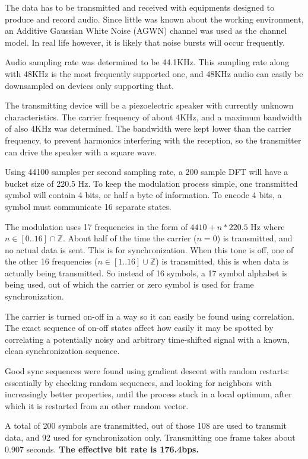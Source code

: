 \documentclass[a4paper]{article}
\begin{document}
The data has to be transmitted and received with equipments designed to
produce and record audio. Since little was known about the working
environment, an Additive Gaussian White Noise (AGWN) channel was used
as the channel model. In real life however, it is likely that noise
bursts will occur frequently.

Audio sampling rate was determined to be 44.1KHz. This sampling rate 
along with 48KHz is the most frequently supported one, and 48KHz audio 
can easily be downsampled on devices only supporting that.

The transmitting device will be a piezoelectric speaker with currently
unknown characteristics. The carrier frequency of about 4KHz, and a
maximum bandwidth of also 4KHz was determined. The bandwidth were kept
lower than the carrier frequency, to prevent harmonics interfering with
the reception, so the transmitter can drive the speaker with a square
wave.

Using 44100 samples per second sampling rate, a 200 sample DFT will have
a bucket size of 220.5 Hz. To keep the modulation process simple, one
transmitted symbol will contain 4 bits, or half a byte of information.
To encode 4 bits, a symbol must communicate 16 separate states.

The modulation uses 17 frequencies in the form of $4410 + n*220.5$ Hz
where $n \in [0..16] \cap \mathbb{Z}$. About half of the time the
carrier ($n=0$) is transmitted, and no actual data is sent. This is for
synchronization. When this tone is off, one of the other 16 frequencies
($n \in [1..16] \cup \mathbb{Z}$) is transmitted, this is when data is
actually being transmitted. So instead of 16 symbols, a 17 symbol
alphabet is being used, out of which the carrier or zero symbol is used
for frame synchronization.

The carrier is turned on-off in a way so it can easily be found using 
correlation. The exact sequence of on-off states affect how easily it 
may be spotted by correlating a potentially noisy and arbitrary 
time-shifted signal with a known, clean synchronization sequence.

Good sync sequences were found using gradient descent with random 
restarts: essentially by checking random sequences, and looking for 
neighbors with increasingly better properties, until the process 
stuck in a local optimum, after which it is restarted from an other
random vector.

A total of 200 symbols are transmitted, out of those 108 are used to 
transmit data, and 92 used for synchronization only. Transmitting one 
frame takes about 0.907 seconds. \textbf{The effective bit rate is 
176.4bps.}
\end{document}
